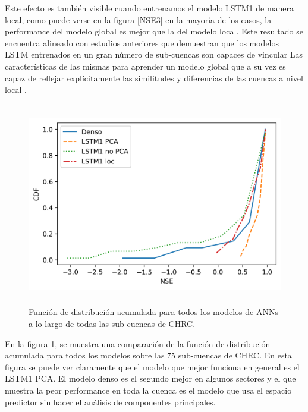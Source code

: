
Este efecto es también visible cuando entrenamos el modelo LSTM1 de manera local,
como puede verse en la figura \ref{NSE3} en la mayoría de los casos, la performance del modelo global  es 
mejor que la del modelo local. Este resultado se encuentra alineado con estudios anteriores 
que demuestran que los modelos LSTM entrenados en un gran número de sub-cuencas son capaces de vincular Las
características de las mismas para aprender un modelo global que a su vez es capaz de reflejar  
explícitamente las similitudes y diferencias de las cuencas a nivel local  \cite{Kratzert}. 


\begin{figure}[h!]
  \begin{center}
    \includegraphics[height=3.5in]{Figures/NSE/CDF.png}
    \caption{ Función de distribución acumulada para todos los modelos de ANNs a lo largo de todas las sub-cuencas de CHRC.}
    \label{CDF}
  \end{center}
\end{figure}

En la figura \ref{CDF}, se muestra una comparación de la función de distribución acumulada para todos los modelos sobre las 75 sub-cuencas de CHRC.
En esta figura se puede ver claramente que el modelo que mejor funciona en general es el LSTM1 PCA. El modelo denso es el segundo mejor en algunos
sectores y el que muestra la peor performance en toda la cuenca es el modelo que usa el espacio predictor sin hacer el análisis de componentes principales.

